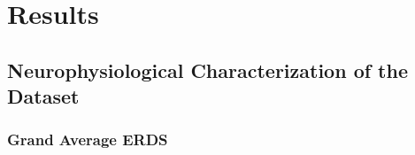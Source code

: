 \chapter{Results}
\label{ch:results}

%
%
%


\section{Neurophysiological Characterization of the Dataset}
\label{sec:results_neuro}



\subsection{Grand Average ERDS}
\label{subsec:results_grand_erds}

%
%
%
%
%
%
%
%
%



